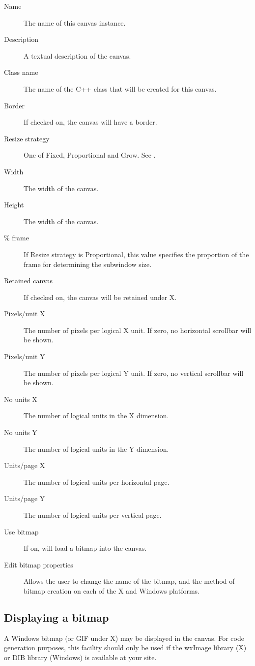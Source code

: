\begin{description}
\item[Name] The name of this canvas instance.
\item[Description] A textual description of the canvas.
\item[Class name] The name of the C++ class that will be created for
this canvas.
\item[Border] If checked on, the canvas will have a border.
\item[Resize strategy] One of Fixed, Proportional and Grow.
See .
\item[Width] The width of the canvas.
\item[Height] The width of the canvas.
\item[\% frame] If Resize strategy is Proportional, this value specifies
the proportion of the frame for determining the subwindow size.
\item[Retained canvas] If checked on, the canvas will be retained under X.
\item[Pixels/unit X] The number of pixels per logical X unit. If zero,
no horizontal scrollbar will be shown.
\item[Pixels/unit Y] The number of pixels per logical Y unit. If zero,
no vertical scrollbar will be shown.
\item[No units X] The number of logical units in the X dimension.
\item[No units Y] The number of logical units in the Y dimension.
\item[Units/page X] The number of logical units per horizontal page.
\item[Units/page Y] The number of logical units per vertical page.
\item[Use bitmap] If on, will load a bitmap into the canvas.
\item[Edit bitmap properties] Allows the user to change the name of the bitmap,
and the method of bitmap creation on each of the X and Windows platforms.
\end{description}

\subsection{Displaying a bitmap}

A Windows bitmap (or GIF under X) may be displayed in the canvas.  For
code generation purposes, this facility should only be used if the
wxImage library (X) or DIB library (Windows) is available at your
site.

